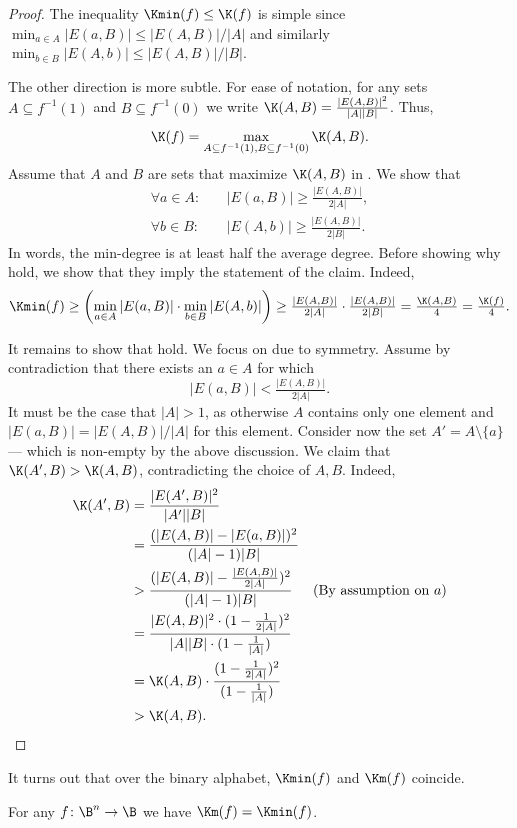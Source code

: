 \documentclass{toc}
\begin{document}
\begin{proof}
The inequality $\Kmin(f)\le\K(f)$ is simple since $\min_{a\in A}{|E(a,B)|}\le|E(A,B)|/|A|$
and similarly $\min_{b\in B}{|E(A,b)|}\le|E(A,B)|/|B|$.

The other direction is more subtle. For ease of notation, for any
sets $A\subseteq f^{-1}(1)$ and $B\subseteq f^{-1}(0)$ we 
%
write %
$\K(A,B)=\frac{|E(A,B)|^{2}}{|A||B|}$. Thus, 
\begin{equation}
\K(f)=\max_{A\subseteq f^{-1}(1),B\subseteq f^{-1}(0)}\K(A,B).\label{eq:K(AB)}
\end{equation}
Assume that $A$ and $B$ are sets that maximize $\K(A,B)$ in .
We show that 
\begin{align}
\forall{a\in A}\colon & \quad|E(a,B)|\ge\tfrac{|E(A,B)|}{2|A|},\label{eq:min deg A}\\
\forall{b\in B}\colon & \quad|E(A,b)|\ge\tfrac{|E(A,B)|}{2|B|}.\label{eq:min deg B}
\end{align}
In words, the min-degree is at least half the average degree. Before
showing why 
 hold, we show that they
imply the statement of the claim. Indeed, 
\[
\Kmin(f)\ge\left(\min_{a\in A}{|E(a,B)|}\cdot\min_{b\in B}{|E(A,b)|}\right)\ge\tfrac{|E(A,B)|}{2|A|}\cdot\tfrac{|E(A,B)|}{2|B|}=\tfrac{\K(A,B)}{4}=\tfrac{\K(f)}{4}.
\]

It remains to show that 
 hold. We
focus on  due to symmetry. Assume by contradiction
that there exists an $a\in A$ for which 
\[
|E(a,B)|<\tfrac{|E(A,B)|}{2|A|}.
\]
It must be the case that $|A|>1$, as otherwise $A$ contains only
one element and $|E(a,B)|=|E(A,B)|/|A|$ for this element. Consider
now the set $A'=A\setminus\{a\}$ --- which is non-empty by the above
discussion. We claim that $\K(A',B)>\K(A,B)$, contradicting the choice
of $A,B$. Indeed, 
\begin{align*}
\K(A',B) & =\frac{|E(A',B)|^{2}}{|A'||B|}\\
 & =\frac{(|E(A,B)|-|E(a,B)|)^{2}}{(|A|-1)|B|}\\
 & >\frac{(|E(A,B)|-\frac{|E(A,B)|}{2|A|})^{2}}{(|A|-1)|B|} & \text{(By assumption on \ensuremath{a})}\\
 & =\frac{|E(A,B)|^{2}\cdot(1-\frac{1}{2|A|})^{2}}{|A||B|\cdot(1-\frac{1}{|A|})}\\
 & =\K(A,B)\cdot\frac{(1-\frac{1}{2|A|})^{2}}{(1-\frac{1}{|A|})}\\
 & >\K(A,B). & \qedhere
\end{align*}
\end{proof}
It turns out that over the binary alphabet, $\Kmin(f)$ and $\Km(f)$
coincide. 
\begin{claim}
\label{claim:Km-Kmin} For any $f\colon\B^{n}\to\B$ we have $\Km(f)=\Kmin(f)$. 
\end{claim}
\end{document}
